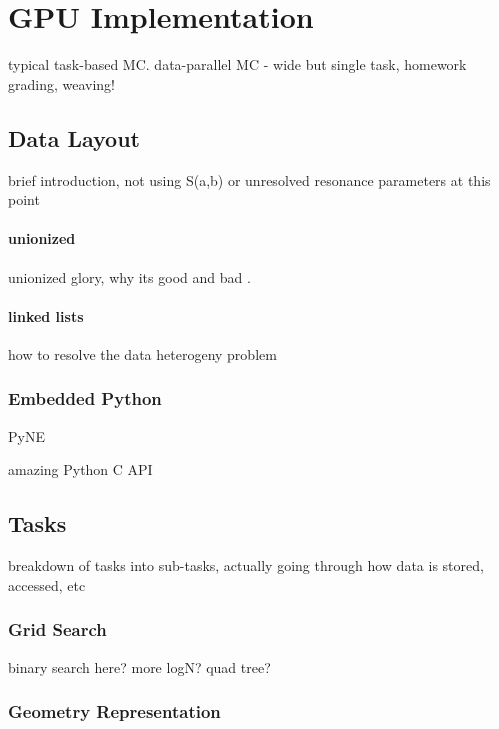 \chapter{GPU Implementation}

typical task-based MC.  data-parallel MC - wide but single task, homework grading, weaving!


\section{Data Layout}

brief introduction, not using S(a,b) or unresolved resonance parameters at this point

\subsubsection{unionized}

unionized glory, why its good and bad \cite{jaakko}.

\subsubsection{linked lists}

how to resolve the data heterogeny problem

\subsection{Embedded Python}

PyNE

amazing Python C API



\section{Tasks}

breakdown of tasks into sub-tasks, actually going through how data is stored, accessed, etc

\subsection{Grid Search}

binary search here? more logN?  quad tree?

\subsection{Geometry Representation}

